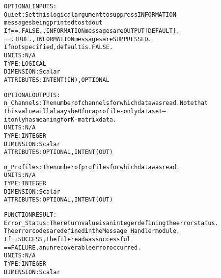 \begin{alltt}
  OPTIONAL INPUTS:
        Quiet:        Set this logical argument to suppress INFORMATION
                      messages being printed to stdout
                      If == .FALSE., INFORMATION messages are OUTPUT [DEFAULT].
                         == .TRUE.,  INFORMATION messages are SUPPRESSED.
                      If not specified, default is .FALSE.
                      UNITS:      N/A
                      TYPE:       LOGICAL
                      DIMENSION:  Scalar
                      ATTRIBUTES: INTENT(IN), OPTIONAL
 
  OPTIONAL OUTPUTS:
        n_Channels:   The number of channels for which data was read. Note that
                      this value will always be 0 for a profile-only dataset--
                      it only has meaning for K-matrix data.
                      UNITS:      N/A
                      TYPE:       INTEGER
                      DIMENSION:  Scalar
                      ATTRIBUTES: OPTIONAL, INTENT(OUT)
 
        n_Profiles:   The number of profiles for which data was read.
                      UNITS:      N/A
                      TYPE:       INTEGER
                      DIMENSION:  Scalar
                      ATTRIBUTES: OPTIONAL, INTENT(OUT)
 
 
  FUNCTION RESULT:
        Error_Status: The return value is an integer defining the error status.
                      The error codes are defined in the Message_Handler module.
                      If == SUCCESS, the file read was successful
                         == FAILURE, an unrecoverable error occurred.
                      UNITS:      N/A
                      TYPE:       INTEGER
                      DIMENSION:  Scalar
 
  \end{alltt}
